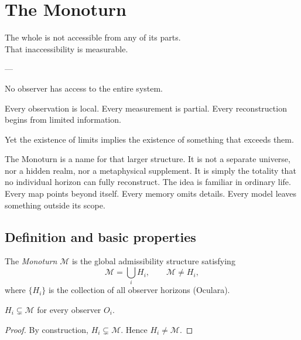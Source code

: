 
\chapter{The Monoturn}
\label{ch:monoturn}

\epigraph{%
  The whole is not accessible from any of its parts.\\
  That inaccessibility is measurable.%
}{---}


\begin{ChapterIntro}
No observer has access to the entire system.

Every observation is local. Every measurement is partial. Every reconstruction begins from limited information.

Yet the existence of limits implies the existence of something that exceeds them.

The Monoturn is a name for that larger structure. It is not a separate universe, nor a hidden realm, nor a metaphysical supplement. It is simply the totality that no individual horizon can fully reconstruct. The idea is familiar in ordinary life. Every map points beyond itself. Every memory omits details. Every model leaves something outside its scope.
\end{ChapterIntro}

\section{Definition and basic properties}

\begin{definition}[Monoturn]
  \label{def:monoturn}
  The \emph{Monoturn} $\mathcal{M}$ is the global admissibility
  structure satisfying
  \[
    \mathcal{M} = \bigcup_i H_i, \qquad \mathcal{M} \neq H_i,
  \]
  where $\{H_i\}$ is the collection of all observer horizons
  (Oculara).
\end{definition}

\begin{proposition}
  \label{prop:monoturn-not-horizon}
  \statusproven{}
  $H_i \subsetneq \mathcal{M}$ for every observer $O_i$.
\end{proposition}

\begin{proof}
  By construction, $H_i \subsetneq \mathcal{M}$.
  Hence $H_i \neq \mathcal{M}$.
\end{proof}

